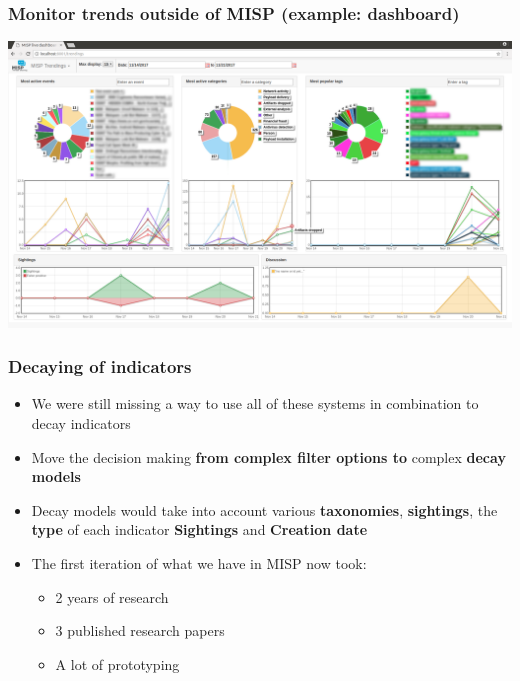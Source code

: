 \begin{frame}
  \frametitle{Monitor trends outside of MISP (example: dashboard)}
  \begin{center}
    \includegraphics[scale=0.2]{dashboard-trendings.png}
  \end{center}
\end{frame}

\begin{frame}
  \frametitle{Decaying of indicators}
  \begin{itemize}
    \item We were still missing a way to use all of these systems in combination to decay indicators
    \item Move the decision making \textbf{from complex filter options to} complex \textbf{decay models}
    \item Decay models would take into account various \textbf{taxonomies}, \textbf{sightings}, the \textbf{type} of each indicator \textbf{Sightings} and \textbf{Creation date}
    \item The first iteration of what we have in MISP now took:
    \begin{itemize}
       \item 2 years of research
       \item 3 published research papers
       \item A lot of prototyping
    \end{itemize}
  \end{itemize}
\end{frame}

